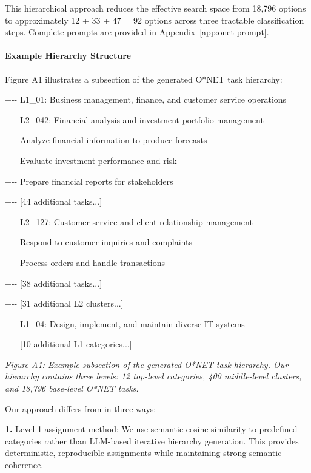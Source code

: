 \documentclass[manuscript,screen,nonacm,oneside]{acmart}
\begin{document}
This hierarchical approach reduces the effective search space from 18,796 options to approximately 12 + 33 + 47 = 92 options across three tractable classification steps. Complete prompts are provided in Appendix~\ref{app:onet-prompt}.

\paragraph{Example Hierarchy Structure}\label{example-hierarchy-structure}

Figure A1 illustrates a subsection of the generated O*NET task hierarchy:

+-\/- L1\_01: Business management, finance, and customer service operations

\textbar{} +-\/- L2\_042: Financial analysis and investment portfolio management

\textbar{} \textbar{} +-\/- Analyze financial information to produce forecasts

\textbar{} \textbar{} +-\/- Evaluate investment performance and risk

\textbar{} \textbar{} +-\/- Prepare financial reports for stakeholders

\textbar{} \textbar{} +-\/- {[}44 additional tasks...{]}

\textbar{} +-\/- L2\_127: Customer service and client relationship management

\textbar{} \textbar{} +-\/- Respond to customer inquiries and complaints

\textbar{} \textbar{} +-\/- Process orders and handle transactions

\textbar{} \textbar{} +-\/- {[}38 additional tasks...{]}

\textbar{} +-\/- {[}31 additional L2 clusters...{]}

+-\/- L1\_04: Design, implement, and maintain diverse IT systems

+-\/- {[}10 additional L1 categories...{]}

\emph{Figure A1: Example subsection of the generated O*NET task hierarchy. Our hierarchy contains three levels: 12 top-level categories, 400 middle-level clusters, and 18,796 base-level O*NET tasks.}

Our approach differs from \citet{handa2025which} in three ways:

\textbf{1.} Level 1 assignment method: We use semantic cosine similarity to predefined categories rather than LLM-based iterative hierarchy generation. This provides deterministic, reproducible assignments while maintaining strong semantic coherence.
\end{document}
